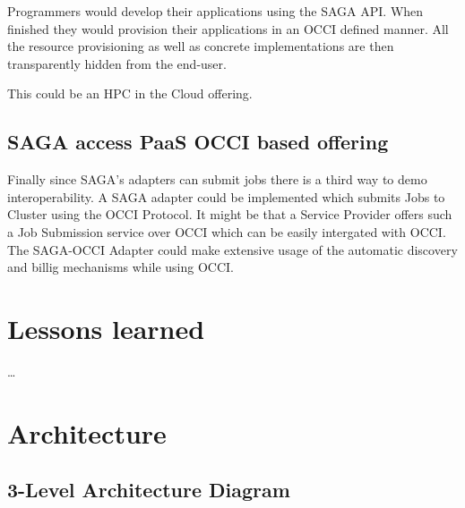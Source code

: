 \documentclass[10pt,conference,final,letterpaper,twoside,twocolumn,]{IEEEtran}
\begin{document}
Programmers would develop their applications using the SAGA API. When
finished they would provision their applications in an OCCI defined
manner. All the resource provisioning as well as concrete
implementations are then transparently hidden from the end-user.

This could be an HPC in the Cloud offering.

\subsection{SAGA access PaaS OCCI based offering}
Finally since SAGA's adapters can submit jobs there is a third way to
demo interoperability. A SAGA adapter could be implemented which
submits Jobs to Cluster using the OCCI Protocol. It might be that a
Service Provider offers such a Job Submission service over OCCI which
can be easily intergated with OCCI. The SAGA-OCCI Adapter could make
extensive usage of the automatic discovery and billig mechanisms while
using OCCI.

\section{Lessons learned}

\ldots

\section{Architecture}

\subsection{3-Level Architecture Diagram}



\end{document}
